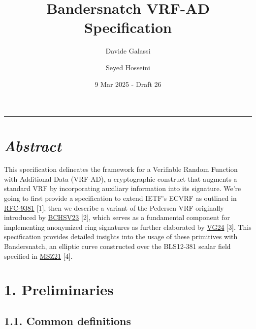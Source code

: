 \documentclass[
]{article}
\title{Bandersnatch VRF-AD Specification}
\author{Davide Galassi \and Seyed Hosseini}
\date{9 Mar 2025 - Draft 26}
\begin{document}
\maketitle

\newcommand{\G}{\bold{G}}
\newcommand{\F}{\bold{F}}
\newcommand{\S}{\bold{\Sigma}}

\begin{center}\rule{0.5\linewidth}{0.5pt}\end{center}

\section{\texorpdfstring{\emph{Abstract}}{Abstract}}\label{abstract}

This specification delineates the framework for a Verifiable Random
Function with Additional Data (VRF-AD), a cryptographic construct that
augments a standard VRF by incorporating auxiliary information into its
signature. We're going to first provide a specification to extend IETF's
ECVRF as outlined in
\href{https://datatracker.ietf.org/doc/rfc9381}{RFC-9381} {[}1{]}, then
we describe a variant of the Pedersen VRF originally introduced by
\href{https://eprint.iacr.org/2023/002}{BCHSV23} {[}2{]}, which serves
as a fundamental component for implementing anonymized ring signatures
as further elaborated by
\href{https://github.com/davxy/ring-proof-spec}{VG24} {[}3{]}. This
specification provides detailed insights into the usage of these
primitives with Bandersnatch, an elliptic curve constructed over the
BLS12-381 scalar field specified in
\href{https://eprint.iacr.org/2021/1152}{MSZ21} {[}4{]}.

\section{1. Preliminaries}\label{preliminaries}

\subsection{1.1. Common definitions}\label{common-definitions}
\end{document}
